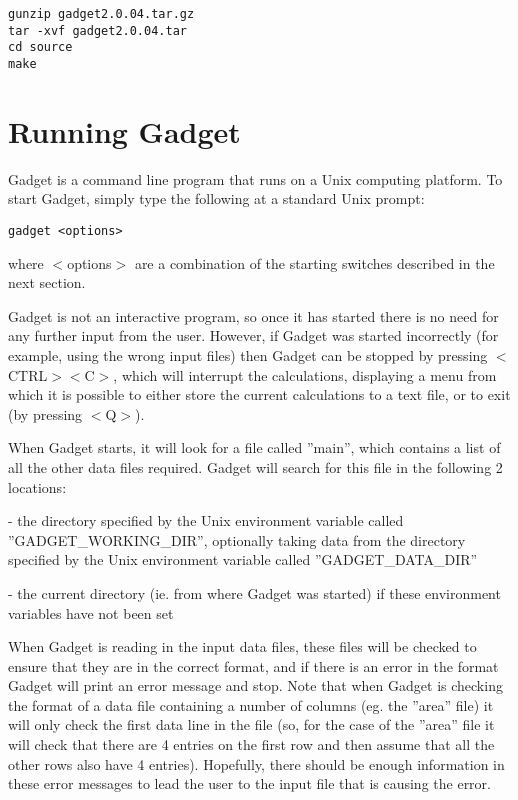 \documentclass [a4paper, 10pt]{book}
\begin{document}
{\small\begin{verbatim}
gunzip gadget2.0.04.tar.gz
tar -xvf gadget2.0.04.tar
cd source
make
\end{verbatim}}

\section{Running Gadget}\label{sec:runninggadget}
Gadget is a command line program that runs on a Unix computing platform.  To start Gadget, simply type the following at a standard Unix prompt:

{\small\begin{verbatim}
gadget <options>
\end{verbatim}}

where $<$options$>$ are a combination of the starting switches described in the next section.

\bigskip
Gadget is not an interactive program, so once it has started there is no need for any further input from the user.  However, if Gadget was started incorrectly (for example, using the wrong input files) then Gadget can be stopped by pressing $<$CTRL$><$C$>$, which will interrupt the calculations, displaying a menu from which it is possible to either store the current calculations to a text file, or to exit (by pressing $<$Q$>$).

\bigskip
When Gadget starts, it will look for a file called ''main'', which contains a list of all the other data files required.  Gadget will search for this file in the following 2 locations:

 - the directory specified by the Unix environment variable called ''GADGET\_WORKING\_DIR'', optionally taking data from the directory specified by the Unix environment variable called ''GADGET\_DATA\_DIR''

 - the current directory (ie. from where Gadget was started) if these environment variables have not been set

\bigskip
When Gadget is reading in the input data files, these files will be checked to ensure that they are in the correct format, and if there is an error in the format Gadget will print an error message and stop.  Note that when Gadget is checking the format of a data file containing a number of columns (eg. the ''area'' file) it will only check the first data line in the file (so, for the case of the ''area'' file it will check that there are 4 entries on the first row and then assume that all the other rows also have 4 entries).  Hopefully, there should be enough information in these error messages to lead the user to the input file that is causing the error.
\end{document}
